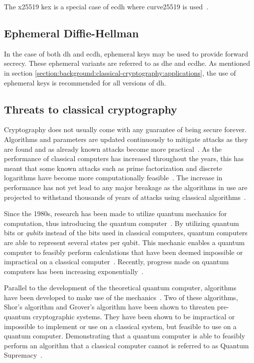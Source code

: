 The \gls{x25519} \gls{kex} is a special case of \gls{ecdh} where \gls{curve25519} is used~\cite{rfc7748}. 

\subsection{Ephemeral Diffie-Hellman}

In the case of both \gls{dh} and \gls{ecdh}, ephemeral keys may be used to provide forward secrecy. These ephemeral variants are referred to as \gls{dhe} and \gls{ecdhe}. As mentioned in section \ref{section:background:classical-cryptography:applications}, the use of ephemeral keys is recommended for all versions of \gls{dh}.

\subsection{Threats to classical cryptography}
\label{section:background:classical-cryptography-threats}

Cryptography does not usually come with any guarantee of being secure forever. Algorithms and parameters are updated continuously to mitigate attacks as they are found and as already known attacks become more practical~\cite{nist2019}. As the performance of classical computers has increased throughout the years, this has meant that some known attacks such as prime factorization and discrete logarithms have become more computationally feasible~\cite{theis2017}. The increase in performance has not yet lead to any major breakage as the algorithms in use are projected to withstand thousands of years of attacks using classical algorithms~\cite{thome2019}.

Since the 1980s, research has been made to utilize quantum mechanics for computation, thus introducing the quantum computer~\cite{benioff1980}. By utilizing quantum bits or \textit{\glspl{qubit}} instead of the bits used in classical computers, quantum computers are able to represent several states per \gls{qubit}. This mechanic enables a quantum computer to feasibly perform calculations that have been deemed impossible or impractical on a classical computer~\cite{jordan2021}. Recently, progress made on quantum computers has been increasing exponentially~\cite{ibm2020:quantum-computer}.

Parallel to the development of the theoretical quantum computer, algorithms have been developed to make use of the mechanics~\cite{shor1997, jordan2021}. Two of these algorithms, Shor's algorithm and Grover's algorithm have been shown to threaten pre-quantum cryptographic systems. They have been shown to be impractical or impossible to implement or use on a classical system, but feasible to use on a quantum computer. Demonstrating that a quantum computer is able to feasibly perform an algorithm that a classical computer cannot is referred to as Quantum Supremacy~\cite{farhi2019}.

